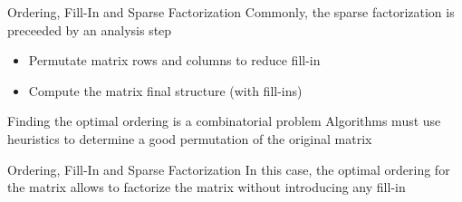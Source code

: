 \documentclass[presentation]{beamer}
\begin{document}
\begin{frame}[label={sec:orgf91bff0}]{Ordering, Fill-In and Sparse Factorization}
\vfill
Commonly, the sparse factorization is preceeded by an \alert{analysis} step
\begin{itemize}
\item Permutate matrix rows and columns to reduce fill-in
\item Compute the matrix final structure (with fill-ins)
\end{itemize}
\vfill
Finding the \alert{optimal ordering} is a combinatorial problem
\vfill
Algorithms must use \alert{heuristics} to determine a good permutation of the
original matrix 
\vfill
\end{frame}

\begin{frame}[label={sec:orgbdefa6e}]{Ordering, Fill-In and Sparse Factorization}
In this case, the optimal ordering for the matrix allows to factorize
the matrix \alert{without introducing any fill-in}

\end{frame}
\end{document}

